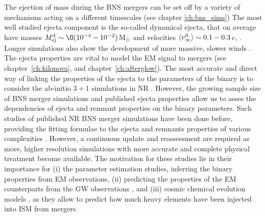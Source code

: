 The ejection of mass during the \ac{BNS} mergers can be set off by a variety of mechanisms acting
on a different timescales (see chapter \ref{ch:bns_sims}) 
%
%
The most well studied ejecta component is the so-called dynamical ejecta, that on average 
have masses $\md\sim\O(10^{-4}-10^{-2})\,\Msun$ and velocities $\langle v^{\text{d}}_\infty\rangle\sim0.1-0.3\,$c, 
\citep[see \eg][]{Rosswog:1998hy,Rosswog:2005su,Hotokezaka:2013iia,Bauswein:2013yna,Wanajo:2014wha,Sekiguchi:2015dma,Radice:2016dwd,Sekiguchi:2016bjd,Vincent:2019kor}.
%
Longer simulations also show the development of more massive, slower winds 
\citep[see \eg][]{Dessart:2008zd,Fernandez:2014bra,Perego:2014fma,Just:2014fka,Kasen:2014toa,Metzger:2014ila,Martin:2015hxa,Wu:2016pnw,Siegel:2017nub,Fujibayashi:2017puw,Fahlman:2018llv,Metzger:2018uni,Fernandez:2018kax,Miller:2019dpt}. 
%
The ejecta properties are vital to model the \ac{EM} signal to mergers 
(see chapter~\ref{ch:kilonova}, and chapter~\ref{ch:afterglow}). 
%
The most accurate and direct way of linking the properties of the ejecta to the parameters of 
the binary is to consider the ab-initio $3+1$ simulations in \ac{NR}
\citep[\eg][]{Hotokezaka:2012ze,Hotokezaka:2013iia,Wanajo:2014wha,Sekiguchi:2015dma,Dietrich:2015iva,Palenzuela:2015dqa,Bernuzzi:2015opx,Radice:2016dwd,Lehner:2016lxy,Sekiguchi:2016bjd,Radice:2018pdn,Vincent:2019kor,Perego:2019adq,Kiuchi:2019lls,Endrizzi:2019trv,Bernuzzi:2020txg}.
%
However, the growing sample size of \ac{BNS} merger simulations and published ejecta 
properties allow us to asses the dependencies of ejecta and remnant properties on the
binary parameters.
%
Such studies of published \ac{NR} \ac{BNS} merger simulations have been done before, 
providing the fitting formulae to the ejecta and \pmerg{} remnants properties of various 
complexities \citep{Dietrich:2016fpt,Radice:2018pdn,Kruger:2020gig}. 
%
However, a continuous update and reassessment are required as more, higher resolution 
simulations with more accurate and complete physical treatment become available. 
%
The motivation for these studies lie in their importance for 
(i) the parameter estimation studies, inferring the binary properties from \ac{EM} observations,
\citep[\eg][]{Radice:2017lry,Perego:2017wtu,Coughlin:2018fis,Coughlin:2019zqi} 
(ii) predicting the properties of the \ac{EM} counterparts from the \ac{GW} observations 
\citep[\eg][]{Stachie:2021noh}, and 
(iii) cosmic chemical evolution models \citep[\eg][]{Bonetti:2019fxj}, as they allow 
to predict how much heavy elements have been injected into \ac{ISM} from mergers.

